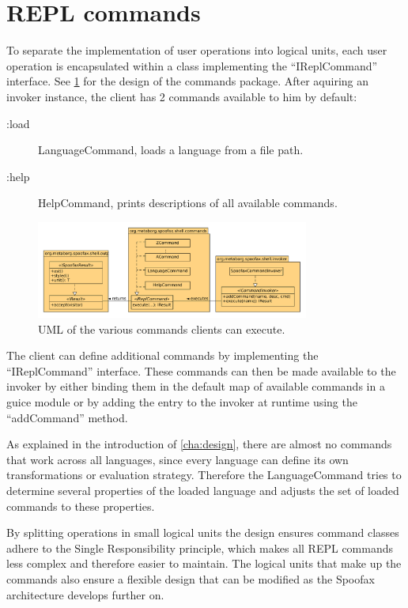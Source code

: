 \section{REPL commands}
\label{sec:commands}

To separate the implementation of user operations into logical units, each user
operation is encapsulated within a class implementing the ``IReplCommand''
interface. See \cref{fig:uml-commands} for the design of the commands package.
After aquiring an invoker instance, the client has 2 commands available to him
by default:

\begin{description}
  \item [:load] LanguageCommand, loads a language from a file path.
  \item [:help] HelpCommand, prints descriptions of all available commands.
\end{description}

\begin{figure}[h]
  \centering
  \includegraphics[width=0.8\textwidth]{uml-commands}
  \caption{UML of the various commands clients can execute.}
  \label{fig:uml-commands}
\end{figure}

The client can define additional commands by implementing the ``IReplCommand''
interface. These commands can then be made available to the invoker by either
binding them in the default map of available commands in a guice module or by
adding the entry to the invoker at runtime using the ``addCommand'' method.

As explained in the introduction of \cref{cha:design}, there are almost no
commands that work across all languages, since every language can define its
own transformations or evaluation strategy. Therefore the LanguageCommand tries
to determine several properties of the loaded language and adjusts the set of
loaded commands to these properties.

By splitting operations in small logical units the design ensures command
classes adhere to the Single Responsibility principle, which makes all REPL
commands less complex and therefore easier to maintain. The logical units that
make up the commands also ensure a flexible design that can be modified
as the Spoofax architecture develops further on.

